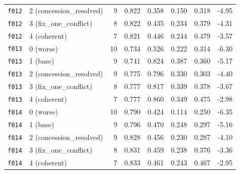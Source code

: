 \documentclass[11pt]{article}
\begin{document}
\begin{table}[htbp]
\begin{tabular}{llrrrrrr}
\texttt{f012} & 2 (concession\_resolved) & 9 & 0.822 & 0.358 & 0.150 & 0.318 & -4.95 \\
\texttt{f012} & 3 (fix\_one\_conflict) & 8 & 0.822 & 0.435 & 0.234 & 0.379 & -4.31 \\
\texttt{f012} & 4 (coherent) & 7 & 0.821 & 0.446 & 0.244 & 0.479 & -3.57 \\
\midrule
\texttt{f013} & 0 (worse) & 10 & 0.734 & 0.526 & 0.222 & 0.314 & -6.30 \\
\texttt{f013} & 1 (base) & 9 & 0.741 & 0.824 & 0.387 & 0.360 & -5.17 \\
\texttt{f013} & 2 (concession\_resolved) & 9 & 0.775 & 0.796 & 0.330 & 0.303 & -4.40 \\
\texttt{f013} & 3 (fix\_one\_conflict) & 8 & 0.777 & 0.817 & 0.339 & 0.378 & -3.67 \\
\texttt{f013} & 4 (coherent) & 7 & 0.777 & 0.860 & 0.349 & 0.475 & -2.98 \\
\midrule
\texttt{f014} & 0 (worse) & 10 & 0.790 & 0.424 & 0.114 & 0.250 & -6.35 \\
\texttt{f014} & 1 (base) & 9 & 0.796 & 0.470 & 0.248 & 0.297 & -5.16 \\
\texttt{f014} & 2 (concession\_resolved) & 9 & 0.828 & 0.456 & 0.230 & 0.287 & -4.10 \\
\texttt{f014} & 3 (fix\_one\_conflict) & 8 & 0.831 & 0.459 & 0.238 & 0.376 & -3.36 \\
\texttt{f014} & 4 (coherent) & 7 & 0.833 & 0.461 & 0.243 & 0.467 & -2.95 \\
\bottomrule
\end{tabular}
\end{table}
\end{document}
